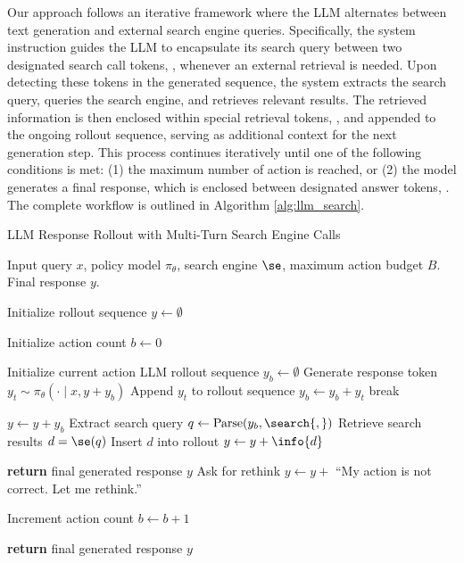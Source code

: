Our approach follows an iterative framework where the LLM alternates between text generation and external search engine queries. Specifically, the system instruction guides the LLM to encapsulate its search query between two designated search call tokens, , whenever an external retrieval is needed. Upon detecting these tokens in the generated sequence, the system extracts the search query, queries the search engine, and retrieves relevant results.
The retrieved information is then enclosed within special retrieval tokens, , and appended to the ongoing rollout sequence, serving as additional context for the next generation step. 
This process continues iteratively until one of the following conditions is met: (1) the maximum number of action is reached, or (2) the model generates a final response, which is enclosed between designated answer tokens, .
The complete workflow is outlined in Algorithm \ref{alg:llm_search}.

\begin{algorithm}[t]
\caption{LLM Response Rollout with Multi-Turn Search Engine Calls}
\label{alg:llm_search}
\begin{algorithmic}[1]
\Require Input query \( x \), policy model \( \pi_{\theta} \), search engine \( \se \), maximum action budget \( B \).
\Ensure Final response \( y \).

\State Initialize rollout sequence \( y \gets \emptyset \)

\State Initialize action count \( b \gets 0 \)

    \State Initialize current action LLM rollout sequence \( y_b \gets \emptyset \) 
    \State Generate response token \( y_t \sim \pi_{\theta}(\cdot \mid x, y + y_b) \)
    \State Append \( y_t \) to rollout sequence \( y_b \gets y_b + y_t \)
        break
    \EndIf
    \EndWhile

    \State \( y  \gets  y + y_b \)
        \State Extract search query \( q \gets \text{Parse}(y_b, \search{,} ) \)
        \State Retrieve search results \( d = \se(q) \)
        \State Insert $d$ into rollout \( y  \gets  y + \info{d}  \)
        
        \State \textbf{return} final generated response \( y \)
    \Else
        \State Ask for rethink \( y  \gets  y + \) ``My action is not correct. Let me rethink.''
    \EndIf

    \State Increment action count \( b \gets b + 1 \)
\EndWhile

\State \textbf{return} final generated response \( y \)
\end{algorithmic}
\end{algorithm}

